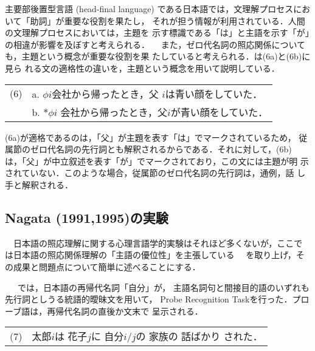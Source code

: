 
主要部後置型言語 (head-final language)
である日本語では，文理解プロセスにおいて「助詞」が重要な役割を果たし，
それが担う情報が利用されている．人間の文理解プロセスにおいては，主題を
示す標識である「は」と主語を示す「が」の相違が影響を及ぼすと考えられる．
　また，ゼロ代名詞の照応関係についても，主題という概念が重要な役割を果
たしていると考えられる．\cite{takami:1997}は(6a)と(6b)に見ら
れる文の適格性の違いを，主題という概念を用いて説明している．


\vspace{3mm}
\begin{tabular}{cl}
 (6)& a. $\phi i$会社から帰ったとき，父 $i$は青い顔をしていた．\\
    & b. $*\phi i$ 会社から帰ったとき，父$i$が青い顔をしていた．\\
\end{tabular}
\vspace{3mm}

(6a)が適格であるのは，「父」が主題を表す「は」でマークされているため，
従属節のゼロ代名詞の先行詞とも解釈されるからである．それに対して，(6b)
は，「父」が中立叙述を表す「が」でマークされており，この文には主題が明
示されていない．このような場合，従属節のゼロ代名詞の先行詞は，通例，話
し手と解釈される．

\subsection{Nagata (1991,1995)の実験}

　日本語の照応理解に関する心理言語学的実験はそれほど多くないが，ここで
は日本語の照応関係理解の「主語の優位性」を主張している
~\cite{nagata:1991}~\cite{nagata:1995}を取り上げ，そ
の成果と問題点について簡単に述べることにする．

　~\cite{nagata:1991}では，日本語の再帰代名詞「自分」が，
主語名詞句と間接目的語のいずれも先行詞としうる統語的曖昧文を用いて，
Probe Recognition Taskを行った．プローブ語は，再帰代名詞の直後か文末で
呈示される．

\vspace{3mm}
\begin{tabular}{cl}
 (7) & 太郎$i$は 花子$j$に 自分$i/j$の 家族の 話ばかり された．\\
\end{tabular}
\vspace{3mm}

